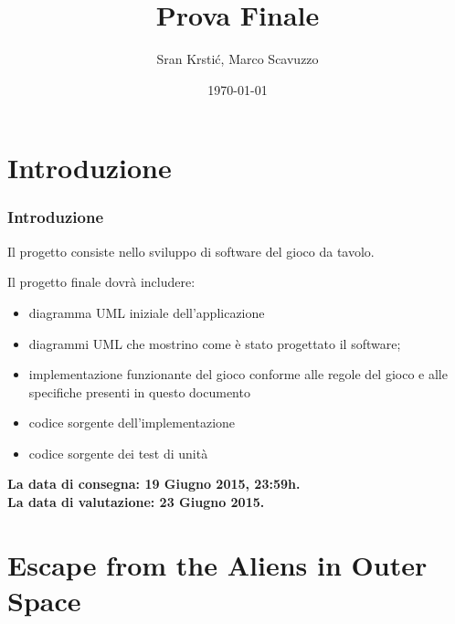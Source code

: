 \documentclass{beamer}
\title[Prova Finale]{Prova Finale} %
\author{Sr\dj{}an Krsti\'c, Marco Scavuzzo} %
\institute[] %
{
Politecnico di Milano \\ %
\medskip
\textit{srdan.krstic@polimi.it, marco.scavuzzo@polimi.it} %
}
\date{\today} %
\begin{document}
\begin{frame}
\titlepage %
\end{frame}





\section{Introduzione}
\begin{frame}
\frametitle{Introduzione}
Il progetto consiste nello sviluppo di software del gioco da tavolo.

Il progetto finale dovr\` a includere:
\begin{itemize}
\item diagramma UML iniziale dell'applicazione
\item diagrammi UML che mostrino come \` e stato progettato il software;
\item implementazione funzionante del gioco conforme alle regole del gioco e alle specifiche presenti in questo documento
\item codice sorgente dell'implementazione
\item codice sorgente dei test di unit\`a
\end{itemize}
\textbf{La data di consegna: 19 Giugno 2015, 23:59h.}\\
\textbf{La data di valutazione: 23 Giugno 2015.}
\end{frame}


{
%
\section{Escape from the Aliens in Outer Space}
\begin{frame}[plain]


\end{frame}
}
\end{document}

